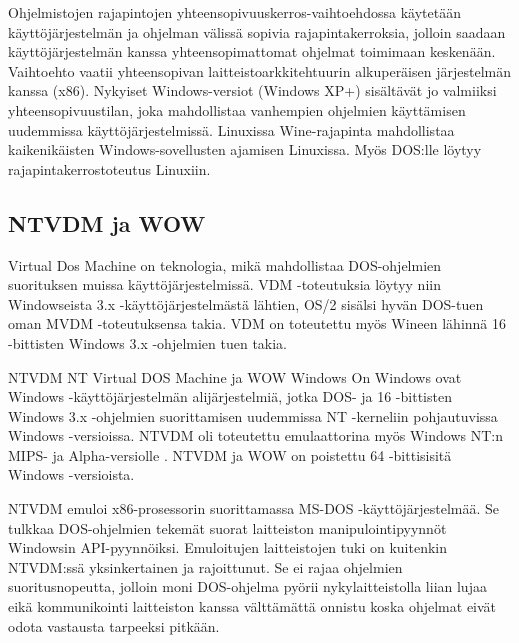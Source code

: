 


Ohjelmistojen rajapintojen yhteensopivuuskerros-vaihtoehdossa  käytetään käyttöjärjestelmän ja ohjelman välissä sopivia rajapintakerroksia, jolloin saadaan käyttöjärjestelmän kanssa yhteensopimattomat ohjelmat toimimaan keskenään. Vaihtoehto vaatii yhteensopivan laitteistoarkkitehtuurin alkuperäisen järjestelmän kanssa (x86). Nykyiset Windows-versiot (Windows XP+) sisältävät jo valmiiksi yhteensopivuustilan, joka mahdollistaa vanhempien ohjelmien käyttämisen uudemmissa käyttöjärjestelmissä. Linuxissa Wine-rajapinta mahdollistaa kaikenikäisten Windows-sovellusten ajamisen Linuxissa. Myös DOS:lle löytyy rajapintakerrostoteutus Linuxiin.

\subsection{NTVDM ja WOW}

Virtual Dos Machine on teknologia, mikä mahdollistaa DOS-ohjelmien suorituksen muissa käyttöjärjestelmissä. VDM -toteutuksia löytyy niin Windowseista 3.x -käyttöjärjestelmästä lähtien, OS/2 sisälsi hyvän DOS-tuen oman MVDM -toteutuksensa takia. VDM on toteutettu myös Wineen lähinnä 16 -bittisten Windows 3.x -ohjelmien tuen takia.

NTVDM NT Virtual DOS Machine ja WOW Windows On Windows ovat Windows -käyttöjärjestelmän alijärjestelmiä, jotka DOS- ja 16 -bittisten Windows 3.x -ohjelmien suorittamisen uudemmissa NT -kerneliin pohjautuvissa Windows -versioissa. NTVDM oli toteutettu emulaattorina myös Windows NT:n MIPS- ja Alpha-versiolle . NTVDM ja WOW on poistettu 64 -bittisisitä Windows -versioista.

NTVDM emuloi x86-prosessorin suorittamassa MS-DOS -käyttöjärjestelmää. Se tulkkaa DOS-ohjelmien tekemät suorat laitteiston manipulointipyynnöt Windowsin API-pyynnöiksi. Emuloitujen laitteistojen tuki on kuitenkin NTVDM:ssä yksinkertainen ja rajoittunut. Se ei rajaa ohjelmien suoritusnopeutta, jolloin moni DOS-ohjelma pyörii nykylaitteistolla liian lujaa eikä kommunikointi laitteiston kanssa välttämättä onnistu koska ohjelmat eivät odota vastausta tarpeeksi pitkään.

